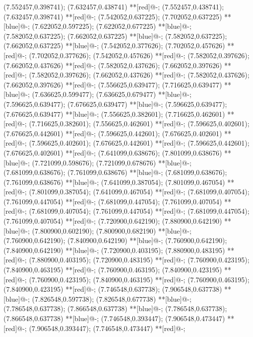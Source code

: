(7.552457,0.398741); (7.632457,0.438741) **[red]@{-};
(7.552457,0.438741); (7.632457,0.398741) **[red]@{-};
(7.542052,0.637225); (7.702052,0.637225) **[blue]@{-};
(7.622052,0.597225); (7.622052,0.677225) **[blue]@{-};
(7.582052,0.637225); (7.662052,0.637225) **[blue]@{-};
(7.582052,0.637225); (7.662052,0.637225) **[blue]@{-};
(7.542052,0.377626); (7.702052,0.457626) **[red]@{-};
(7.702052,0.377626); (7.542052,0.457626) **[red]@{-};
(7.582052,0.397626); (7.662052,0.437626) **[red]@{-};
(7.582052,0.437626); (7.662052,0.397626) **[red]@{-};
(7.582052,0.397626); (7.662052,0.437626) **[red]@{-};
(7.582052,0.437626); (7.662052,0.397626) **[red]@{-};
(7.556625,0.639477); (7.716625,0.639477) **[blue]@{-};
(7.636625,0.599477); (7.636625,0.679477) **[blue]@{-};
(7.596625,0.639477); (7.676625,0.639477) **[blue]@{-};
(7.596625,0.639477); (7.676625,0.639477) **[blue]@{-};
(7.556625,0.382601); (7.716625,0.462601) **[red]@{-};
(7.716625,0.382601); (7.556625,0.462601) **[red]@{-};
(7.596625,0.402601); (7.676625,0.442601) **[red]@{-};
(7.596625,0.442601); (7.676625,0.402601) **[red]@{-};
(7.596625,0.402601); (7.676625,0.442601) **[red]@{-};
(7.596625,0.442601); (7.676625,0.402601) **[red]@{-};
(7.641099,0.638676); (7.801099,0.638676) **[blue]@{-};
(7.721099,0.598676); (7.721099,0.678676) **[blue]@{-};
(7.681099,0.638676); (7.761099,0.638676) **[blue]@{-};
(7.681099,0.638676); (7.761099,0.638676) **[blue]@{-};
(7.641099,0.387054); (7.801099,0.467054) **[red]@{-};
(7.801099,0.387054); (7.641099,0.467054) **[red]@{-};
(7.681099,0.407054); (7.761099,0.447054) **[red]@{-};
(7.681099,0.447054); (7.761099,0.407054) **[red]@{-};
(7.681099,0.407054); (7.761099,0.447054) **[red]@{-};
(7.681099,0.447054); (7.761099,0.407054) **[red]@{-};
(7.720900,0.642190); (7.880900,0.642190) **[blue]@{-};
(7.800900,0.602190); (7.800900,0.682190) **[blue]@{-};
(7.760900,0.642190); (7.840900,0.642190) **[blue]@{-};
(7.760900,0.642190); (7.840900,0.642190) **[blue]@{-};
(7.720900,0.403195); (7.880900,0.483195) **[red]@{-};
(7.880900,0.403195); (7.720900,0.483195) **[red]@{-};
(7.760900,0.423195); (7.840900,0.463195) **[red]@{-};
(7.760900,0.463195); (7.840900,0.423195) **[red]@{-};
(7.760900,0.423195); (7.840900,0.463195) **[red]@{-};
(7.760900,0.463195); (7.840900,0.423195) **[red]@{-};
(7.746548,0.637738); (7.906548,0.637738) **[blue]@{-};
(7.826548,0.597738); (7.826548,0.677738) **[blue]@{-};
(7.786548,0.637738); (7.866548,0.637738) **[blue]@{-};
(7.786548,0.637738); (7.866548,0.637738) **[blue]@{-};
(7.746548,0.393447); (7.906548,0.473447) **[red]@{-};
(7.906548,0.393447); (7.746548,0.473447) **[red]@{-};
